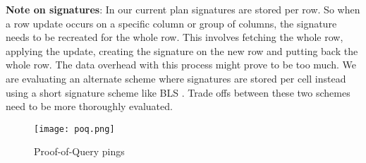 \newline
\newline
\textbf{Note on signatures}: In our current plan signatures are stored per row. So when a row update occurs on a specific column or group of columns, the signature needs to be recreated for the whole row. This involves fetching the whole row, applying the update, creating the signature on the new row and putting back the whole row. The data overhead with this process might prove to be too much. We are evaluating an alternate scheme where signatures are stored per cell instead using a short signature scheme like BLS \cite{bls}. Trade offs between these two schemes need to be more thoroughly evaluated.
\begin{figure}[h!] \centering
	\texttt{[image: poq.png]}
	\caption{\textsf{Proof-of-Query} pings}
	\label{fig:poq}
\end{figure}
